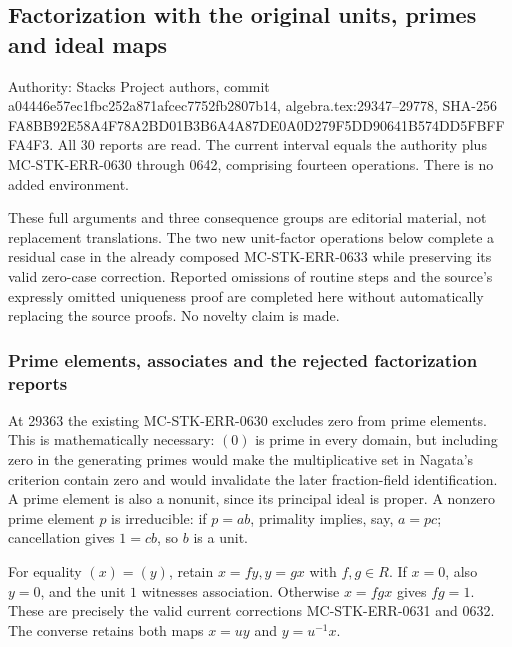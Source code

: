 \subsection{Factorization with the original units, primes and ideal maps}\label{algebra-proof-029-factorization-with-the-original-units-primes-and-ideal-maps}

Authority: Stacks Project authors, commit a044\allowbreak{}46e5\allowbreak{}7ec1\allowbreak{}fbc2\allowbreak{}52a8\allowbreak{}71af\allowbreak{}cec7\allowbreak{}752f\allowbreak{}b280\allowbreak{}7b14, algebra.tex:29347--29778, SHA-256 FA8B\allowbreak{}B92E\allowbreak{}58A4\allowbreak{}F78A\allowbreak{}2BD0\allowbreak{}1B3B\allowbreak{}6A4A\allowbreak{}87DE\allowbreak{}0A0D\allowbreak{}279F\allowbreak{}5DD9\allowbreak{}0641\allowbreak{}B574\allowbreak{}DD5F\allowbreak{}BFFF\allowbreak{}A4F3. All 30 reports are read. The current interval equals the authority plus MC-STK-ERR-0630 through 0642, comprising fourteen operations. There is no added environment.

These full arguments and three consequence groups are editorial material, not replacement translations. The two new unit-factor operations below complete a residual case in the already composed MC-STK-ERR-0633 while preserving its valid zero-case correction. Reported omissions of routine steps and the source's expressly omitted uniqueness proof are completed here without automatically replacing the source proofs. No novelty claim is made.

\subsubsection{Prime elements, associates and the rejected factorization reports}\label{algebra-proof-029-prime-elements-associates-and-the-rejected-factorization-reports}

At 29363 the existing MC-STK-ERR-0630 excludes zero from prime elements. This is mathematically necessary: \((0)\) is prime in every domain, but including zero in the generating primes would make the multiplicative set in Nagata's criterion contain zero and would invalidate the later fraction-field identification. A prime element is also a nonunit, since its principal ideal is proper. A nonzero prime element \(p\) is irreducible: if \(p=ab\), primality implies, say, \(a=pc\); cancellation gives \(1=cb\), so \(b\) is a unit.

For equality \((x)=(y)\), retain \(x=fy,y=gx\) with \(f,g\in R\). If \(x=0\), also \(y=0\), and the unit \(1\) witnesses association. Otherwise \(x=fgx\) gives \(fg=1\). These are precisely the valid current corrections MC-STK-ERR-0631 and 0632. The converse retains both maps \(x=uy\) and \(y=u^{-1}x\).


